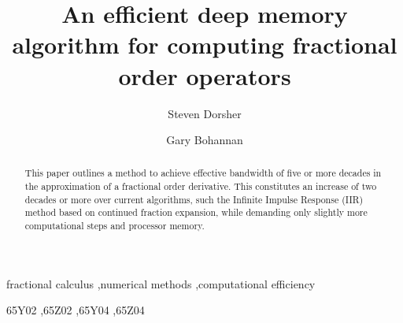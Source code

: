 \documentclass[preprint,12pt]{elsarticle}
\begin{document}
\begin{frontmatter}



\title{An efficient deep memory algorithm for computing fractional order operators}


\author[SCSU]{Steven Dorsher}
\author[SCSU]{Gary Bohannan}

\address[SCSU]{Department of Chemistry and Physics, Saint Cloud State
  University, Saint Cloud, Minnesota}

 \begin{abstract}

This paper outlines a method to achieve effective bandwidth of five or
more decades in the approximation of a fractional order
derivative. This constitutes an increase of two decades or more over
current algorithms, such the Infinite Impulse Response (IIR) method
based on continued fraction expansion, while demanding only slightly
more computational steps and processor memory.

\end{abstract}

\begin{keyword}
fractional calculus \sep numerical methods \sep computational efficiency

\MSC[2010] 65Y02 \sep 65Z02 \sep 65Y04 \sep 65Z04
\end{keyword}

\end{frontmatter}

\end{document}
